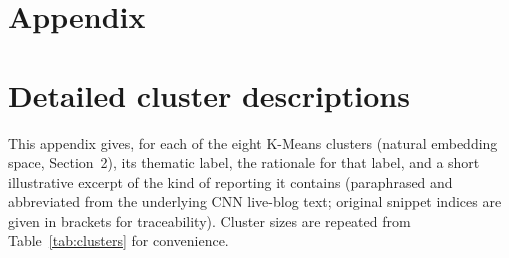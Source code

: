 \documentclass[11pt]{article}
\begin{document}
\clearpage
\appendix
\section*{Appendix}

\section{Detailed cluster descriptions}
\label{app:clusters}

This appendix gives, for each of the eight K-Means clusters (natural
embedding space, Section~2), its thematic label, the rationale for that
label, and a short illustrative excerpt of the kind of reporting it
contains (paraphrased and abbreviated from the underlying CNN live-blog
text; original snippet indices are given in brackets for traceability).
Cluster sizes are repeated from Table~\ref{tab:clusters} for convenience.
\end{document}
